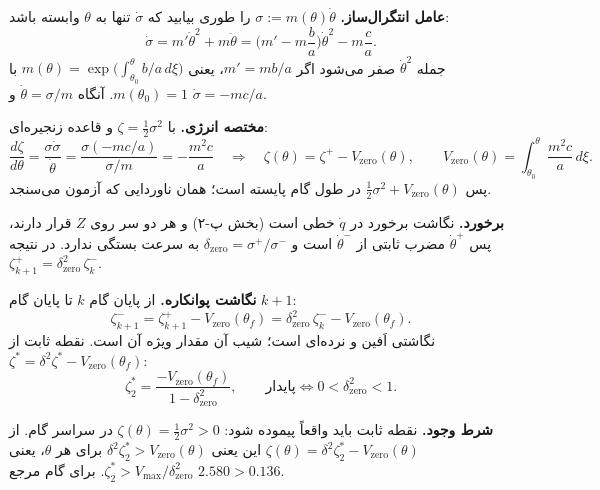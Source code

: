 \documentclass[10pt,twocolumn]{article}
\begin{document}
\textbf{عامل انتگرال‌ساز.} $\sigma:=m(\theta)\dot\theta$ را طوری بیابید که $\dot\sigma$ تنها به
$\theta$ وابسته باشد:
\begin{equation*}
    \dot\sigma=m'\dot\theta^2+m\ddot\theta
    =\Big(m'-m\frac{b}{a}\Big)\dot\theta^2-m\frac{c}{a}.
\end{equation*}
جمله $\dot\theta^2$ صفر می‌شود اگر $m'=mb/a$، یعنی
$m(\theta)=\exp\!\big(\int_{\theta_0}^{\theta}b/a\,d\xi\big)$ با $m(\theta_0)=1$. آنگاه
$\dot\theta=\sigma/m$ و $\dot\sigma=-mc/a$.

\textbf{مختصه انرژی.} با $\zeta=\tfrac12\sigma^2$ و قاعده زنجیره‌ای:
\begin{equation*}
    \frac{d\zeta}{d\theta}=\frac{\sigma\dot\sigma}{\dot\theta}=\frac{\sigma(-mc/a)}{\sigma/m}=-\frac{m^2c}{a}
    \quad\Rightarrow\quad
    \zeta(\theta)=\zeta^{+}-V_{\mathrm{zero}}(\theta),\qquad
    V_{\mathrm{zero}}(\theta)=\int_{\theta_0}^{\theta}\frac{m^2c}{a}\,d\xi .
\end{equation*}
پس $\tfrac12\sigma^2+V_{\mathrm{zero}}(\theta)$ در طول گام پایسته است؛ همان ناوردایی که آزمون می‌سنجد.

\textbf{برخورد.} نگاشت برخورد در $\dot q$ خطی است (بخش پ-۲) و هر دو سر روی $Z$ قرار دارند، پس
$\dot\theta^{+}$ مضرب ثابتی از $\dot\theta^{-}$ است و
$\delta_{\mathrm{zero}}=\sigma^{+}/\sigma^{-}$ به سرعت بستگی ندارد. در نتیجه
$\zeta^{+}_{k+1}=\delta_{\mathrm{zero}}^2\,\zeta^{-}_k$.

\textbf{نگاشت پوانکاره.} از پایان گام $k$ تا پایان گام $k+1$:
\begin{equation*}
    \zeta^{-}_{k+1}=\zeta^{+}_{k+1}-V_{\mathrm{zero}}(\theta_f)=\delta_{\mathrm{zero}}^2\,\zeta^{-}_k-V_{\mathrm{zero}}(\theta_f).
\end{equation*}
نگاشتی اَفین و نرده‌ای است؛ شیب آن مقدار ویژه آن است. نقطه ثابت از $\zeta^*=\delta^2\zeta^*-V_{\mathrm{zero}}(\theta_f)$:
\begin{equation*}
    \zeta^*_2=\frac{-V_{\mathrm{zero}}(\theta_f)}{1-\delta_{\mathrm{zero}}^2},
    \qquad \text{پایدار}\iff 0<\delta_{\mathrm{zero}}^2<1 .
\end{equation*}

\textbf{شرط وجود.} نقطه ثابت باید واقعاً پیموده شود: $\zeta(\theta)=\tfrac12\sigma^2>0$ در سراسر گام. از
$\zeta(\theta)=\delta^2\zeta^*_2-V_{\mathrm{zero}}(\theta)$ این یعنی
$\delta^2\zeta^*_2>V_{\mathrm{zero}}(\theta)$ برای هر $\theta$، یعنی
$\zeta^*_2>V_{\max}/\delta_{\mathrm{zero}}^2$. برای گام مرجع $2.580>0.136$.

\end{document}
